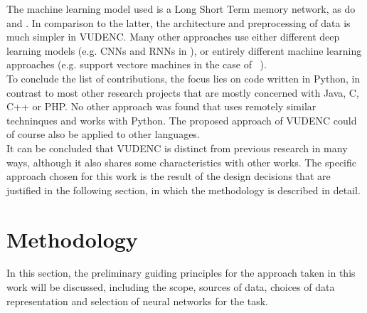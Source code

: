 \documentclass[
	a4paper,
	pagesize,
	pdftex,
	12pt,
	twoside, %
	BCOR=5mm, %
	ngerman,
	fleqn,
	final,
	]{scrartcl}
\begin{document}
The machine learning model used is a Long Short Term memory network, as do \cite{Li.2018} and \cite{Dam.2017}. In comparison to the latter, the architecture and preprocessing of data is much simpler in VUDENC. Many other approaches use either different deep learning models (e.g. CNNs and RNNs in \cite{Russell.2018}), or entirely different machine learning approaches (e.g. support vectore machines in the case of ~\cite{Pang.2015}).\\
To conclude the list of contributions, the focus lies on code written in Python, in contrast to most other research projects that are mostly concerned with Java, C, C++ or PHP. No other approach was found that uses remotely similar techninques and works with Python. The proposed approach of VUDENC could of course also be applied to other languages.\\
It can be concluded that VUDENC is distinct from previous research in many ways, although it also shares some characteristics with other works. The specific approach chosen for this work is the result of the design decisions that are justified in the following section, in which the methodology is described in detail.


\newpage
\section{Methodology}\label{Methodology}
In this section, the  preliminary guiding principles for the approach taken in this work will be discussed, including the scope, sources of data, choices of data representation and selection of neural networks for the task. 
\end{document}
